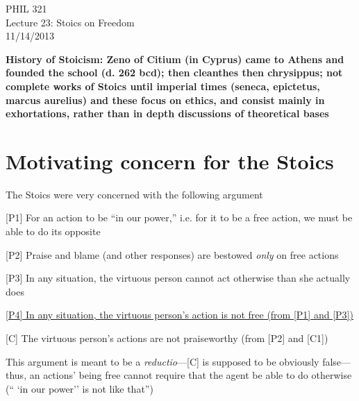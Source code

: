 \documentclass[11pt]{article}
\begin{document}
\thispagestyle{empty}
\begin{center} \LARGE{PHIL 321\\ Lecture 23: Stoics on Freedom}\\ \vspace*{2mm}
\large{11/14/2013}\end{center}
\thispagestyle{empty}\vspace*{3mm}
\vspace*{-8mm}

\noindent\textbf{History of Stoicism: Zeno of Citium (in Cyprus) came to Athens and founded the school (d. 262 bcd); then cleanthes then chrysippus; not complete works of Stoics until imperial times (seneca, epictetus, marcus aurelius) and these focus on ethics, and consist mainly in exhortations, rather than in depth discussions of theoretical bases}

\section*{Motivating concern for the Stoics}

\noindent The Stoics were very concerned with the following argument
\vspace*{2mm}

[P1] For an action to be ``in our power,'' i.e. for it to be a free action, we must be able to do its opposite\vspace*{1mm}

[P2] Praise and blame (and other responses) are bestowed \emph{only} on free actions
\vspace*{1mm}

[P3] In any situation, the virtuous person cannot act otherwise than she actually does
\vspace*{1mm}

\underline{[P4] In any situation, the virtuous person's action is not free (from [P1] and [P3])}
\vspace*{1mm}

[C] The virtuous person's actions are not praiseworthy (from [P2] and [C1])
\vspace*{2mm}

\noindent This argument is meant to be a \emph{reductio}---[C] is supposed to be obviously false---thus, an actions' being free cannot require that the agent be able to do otherwise (`` `in our power'' is not like that'')
\vspace*{-3mm}
\end{document}
